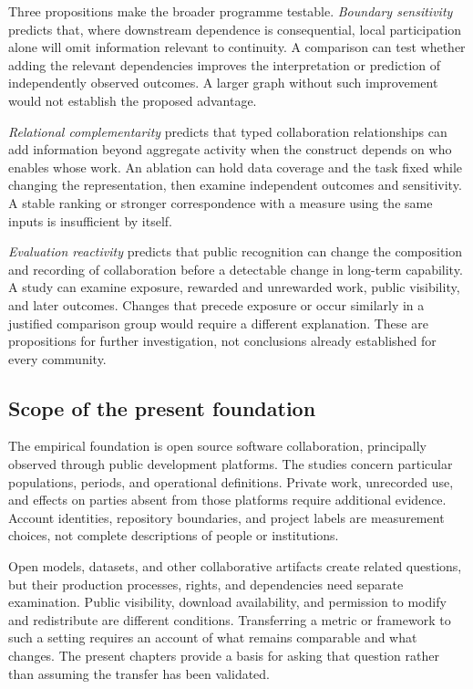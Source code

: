 Three propositions make the broader programme testable. \emph{Boundary sensitivity} predicts that, where downstream dependence is consequential, local participation alone will omit information relevant to continuity. A comparison can test whether adding the relevant dependencies improves the interpretation or prediction of independently observed outcomes. A larger graph without such improvement would not establish the proposed advantage.

\emph{Relational complementarity} predicts that typed collaboration relationships can add information beyond aggregate activity when the construct depends on who enables whose work. An ablation can hold data coverage and the task fixed while changing the representation, then examine independent outcomes and sensitivity. A stable ranking or stronger correspondence with a measure using the same inputs is insufficient by itself.

\emph{Evaluation reactivity} predicts that public recognition can change the composition and recording of collaboration before a detectable change in long-term capability. A study can examine exposure, rewarded and unrewarded work, public visibility, and later outcomes. Changes that precede exposure or occur similarly in a justified comparison group would require a different explanation. These are propositions for further investigation, not conclusions already established for every community.

\subsection{Scope of the present foundation}
The empirical foundation is open source software collaboration, principally observed through public development platforms. The studies concern particular populations, periods, and operational definitions. Private work, unrecorded use, and effects on parties absent from those platforms require additional evidence. Account identities, repository boundaries, and project labels are measurement choices, not complete descriptions of people or institutions.

Open models, datasets, and other collaborative artifacts create related questions, but their production processes, rights, and dependencies need separate examination. Public visibility, download availability, and permission to modify and redistribute are different conditions. Transferring a metric or framework to such a setting requires an account of what remains comparable and what changes. The present chapters provide a basis for asking that question rather than assuming the transfer has been validated.


